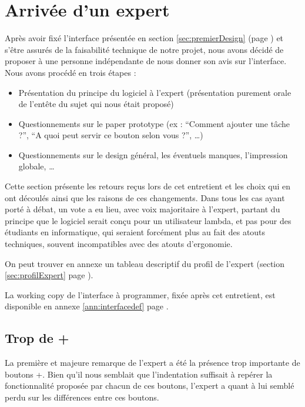 \documentclass[11pt]{article}
\begin{document}


\section{Arrivée d'un expert}

Après avoir fixé l'interface présentée en section
\ref{sec:premierDesign} (page \pageref{sec:premierDesign}) et s'être
assurés de la faisabilité technique de notre projet, nous avons décidé
de proposer à une personne indépendante de nous donner son avis sur
l'interface. Nous avons procédé en trois étapes :

\begin{itemize}
\item Présentation du principe du logiciel à l'expert (présentation
  purement orale de l'entête du sujet qui nous était proposé)
\item Questionnements sur le paper prototype (ex : ``Comment ajouter
  une tâche ?'', ``A quoi peut servir ce bouton selon vous ?'', \dots)
\item Questionnements sur le design général, les éventuels manques,
  l'impression globale, \dots
\end{itemize}

Cette section présente les retours reçus lors de cet entretient et les
choix qui en ont découlés ainsi que les raisons de ces changements.
Dans tous les cas ayant porté à débat, un vote a eu lieu, avec voix
majoritaire à l'expert, partant du principe que le logiciel serait
conçu pour un utilisateur lambda, et pas pour des étudiants en
informatique, qui seraient forcément plus au fait des atouts
techniques, souvent incompatibles avec des atouts d'ergonomie.

On peut trouver en annexe un tableau descriptif du profil de l'expert
(section \ref{sec:profilExpert} page \pageref{sec:profilExpert}).

La working copy de l'interface à programmer, fixée après cet
entretient, est disponible en annexe \ref{ann:interfacedef} page
\pageref{fig:interfacedefdessin}. 

\subsection{Trop de +}

La première et majeure remarque de l'expert a été la présence trop
importante de boutons +. Bien qu'il nous semblait que l'indentation
suffisait à repérer la fonctionnalité proposée par chacun de ces
boutons, l'expert a quant à lui semblé perdu sur les différences entre
ces boutons.
\end{document}

